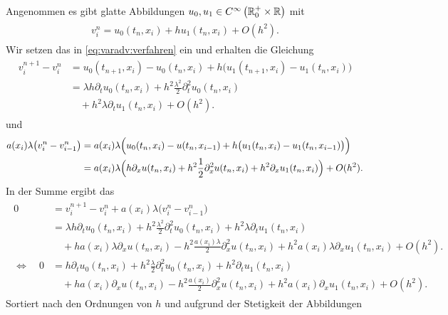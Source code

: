 Angenommen es gibt glatte Abbildungen $u_0, u_1 \in C^{\infty}\left( \mathbb R^+_0 \times \mathbb R \right)$ mit
\begin{align}\label{eq:varadv:reg:ansatz}
\begin{split}
v^n_i = u_0(t_n, x_i) + h u_1(t_n, x_i) + O(h^2).
\end{split}
\end{align}
Wir setzen das in \eqref{eq:varadv:verfahren} ein und erhalten die Gleichung
\begin{align}
\begin{split}
v^{n+1}_i - v^n_i &= u_0(t_{n+1}, x_i) - u_0(t_n, x_i) + h \bigl( u_1(t_{n+1}, x_i) - u_1(t_n, x_i) \bigr)\\
&= \lambda h \partial_t u_0(t_n, x_i) + h^2 \frac{\lambda^2}{2} \partial^2_t u_0(t_n, x_i)\\
&\quad + h^2 \lambda \partial_t u_1(t_n, x_i) + O(h^2).
\end{split}
\end{align}
und
\begin{align}
\begin{split}
a(x_i) \lambda \bigl( v^n_i - v^n_{i-1} \bigr) &= a(x_i) \lambda \Bigl( u_0(t_n, x_i) - u(t_n, x_{i-1}) + h \bigl( u_1(t_n, x_i) - u_1(t_n, x_{i-1}) \bigr) \Bigr)\\
&= a(x_i) \lambda \Bigl( h \partial_x u(t_n, x_i) + h^2 \frac{1}{2} \partial^2_x u(t_n, x_i) + h^2 \partial_x u_1(t_n, x_i) \Bigr) + O(h^2).
\end{split}
\end{align}
In der Summe ergibt das
\begin{align}
\begin{split}
0 &= v^{n+1}_i - v^n_i + a(x_i) \lambda \bigl( v^n_i - v^n_{i-1} \bigr)\\
&= \lambda h \partial_t u_0(t_n, x_i) + h^2 \frac{\lambda^2}{2} \partial^2_t u_0(t_n, x_i) + h^2 \lambda \partial_t u_1(t_n, x_i)\\
&\quad + h a(x_i) \lambda \partial_x u(t_n, x_i) - h^2 \frac{a(x_i) \lambda}{2} \partial^2_x u(t_n, x_i) + h^2 a(x_i) \lambda \partial_x u_1(t_n, x_i) + O(h^2).\\
\Leftrightarrow \quad 0 &= h \partial_t u_0(t_n, x_i) + h^2 \frac{\lambda}{2} \partial^2_t u_0(t_n, x_i) + h^2 \partial_t u_1(t_n, x_i)\\
&\quad + h a(x_i) \partial_x u(t_n, x_i) - h^2 \frac{a(x_i)}{2} \partial^2_x u(t_n, x_i) + h^2 a(x_i) \partial_x u_1(t_n, x_i) + O(h^2).
\end{split}
\end{align}
Sortiert nach den Ordnungen von $h$ und aufgrund der Stetigkeit der Abbildungen
